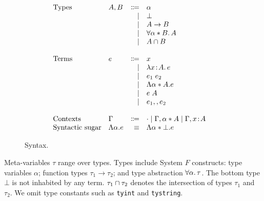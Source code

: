 \begin{figure}
  \[
    \begin{array}{l}
      \begin{array}{llrll}
        \text{Types}
        & A, B & \Coloneqq & \alpha                  & \\
        &      & \mid & \bot                         & \\
        &      & \mid & A \to B                      & \\
        &      & \mid & \forall \alpha * B. \, A  & \\
        &      & \mid & A \cap B               & \\

        \\
        \text{Terms}
        & e & \Coloneqq & x                        & \\
        &   & \mid & \lambda x \!:\! A.\, e                    & \\
        &   & \mid & e_1 \; e_2              & \\
        &   & \mid & \Lambda \alpha * A. e  & \\
        &   & \mid & e \; A                     & \\
        &   & \mid & e_1 ,, e_2              & \\

        \\
        \text{Contexts}
        & \Gamma & \Coloneqq & \cdot
                   \mid \Gamma, \alpha * A
                   \mid \Gamma, x \!:\! A  & \\

        \text{Syntactic sugar} & \Lambda \alpha. e & \equiv & \Lambda \alpha * \bot. e & \\
      \end{array}
    \end{array}
  \]

  \label{fig:fi-syntax}
  \caption{Syntax.}
\end{figure}


Meta-variables $\tau$ range over types. Types include System $F$ constructs:
type variables $\alpha$; function types $\tau_1 \to \tau_2$; and type
abstraction $ \forall \alpha. \, \tau $. The bottom type $\bot$ is not inhabited by any
term. $\tau_1 \cap \tau_2$ denotes the intersection of types $\tau_1$ and
$\tau_2$. We omit type constants such as \lstinline$tyint$ and \lstinline$tystring$.

